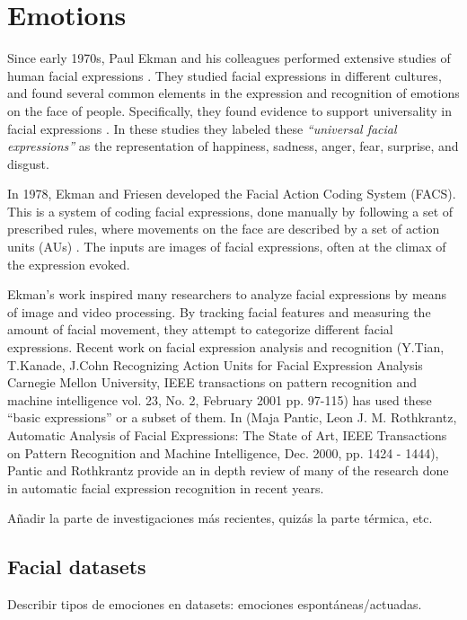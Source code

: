 \section{Emotions}

Since early 1970s, Paul Ekman and his colleagues performed extensive
studies of human facial expressions \citep{Ekman1994, Ekman1993,
Ekman1992, Ekman1992a, Ekman1979}. They studied facial expressions
in different cultures, and found several common elements in the
expression and recognition of emotions on the face of people. Specifically,
they found evidence to support universality in facial expressions
\citep{Ekman1994}. In these studies they labeled these
\textit{``universal facial expressions''} as the representation of
happiness, sadness, anger, fear, surprise, and disgust.

In 1978, Ekman and Friesen developed the Facial Action Coding System
(FACS). This is a system of coding facial expressions, done manually by
following a set of prescribed rules, where movements on the face are
described by a set of action units (AUs) \citep{Ekman1978, Ekman2002}.
The inputs are images of facial expressions, often at the climax of the
expression evoked.

{\color{Orchid}
Ekman's work inspired many researchers to analyze facial expressions by means
of image and video processing. By tracking facial features and measuring the
amount of facial movement, they attempt to categorize different facial
expressions. Recent work on facial expression analysis and recognition
(Y.Tian, T.Kanade, J.Cohn Recognizing Action Units for Facial Expression
Analysis Carnegie Mellon University, IEEE transactions on pattern
recognition and machine intelligence vol. 23, No. 2, February 2001 pp.
97-115) has used these “basic expressions” or a subset of them. In (Maja
Pantic, Leon J. M. Rothkrantz, Automatic Analysis of Facial Expressions:
The State of Art, IEEE Transactions on Pattern Recognition and Machine
Intelligence, Dec. 2000, pp. 1424 - 1444), Pantic and Rothkrantz provide an
in depth review of many of the research done in automatic facial expression
recognition in recent years. }

{\color{JungleGreen} Añadir la parte de investigaciones más recientes, quizás la
parte térmica, etc.}


\subsection{Facial datasets}

{\color{JungleGreen} Describir tipos de emociones en datasets:
emociones espontáneas/actuadas. }


